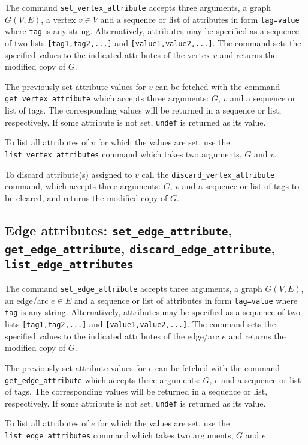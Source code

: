 \documentclass[a4paper,11pt]{article}
\begin{document}
The command {\tt set\_vertex\_attribute} accepts three arguments, a graph $ G(V,E) $, a vertex $ v\in V $ and a sequence or list of attributes in form {\tt tag=value} where {\tt tag} is any string. Alternatively, attributes may be specified as a sequence of two lists {\tt [tag1,tag2,...]} and {\tt [value1,value2,...]}. The command sets the specified values to the indicated attributes of the vertex $ v $ and returns the modified copy of $ G $.

The previously set attribute values for $ v $ can be fetched with the command {\tt get\_vertex\_attribute} which accepts three arguments: $ G $, $ v $ and a sequence or list of tags. The corresponding values will be returned in a sequence or list, respectively. If some attribute is not set, {\tt undef} is returned as its value.

To list all attributes of $ v $ for which the values are set, use the {\tt list\_vertex\_attributes} command which takes two arguments, $ G $ and $ v $.

To discard attribute(s) assigned to $ v $ call the {\tt discard\_vertex\_attribute} command, which accepts three arguments: $ G $, $ v $ and a sequence or list of tags to be cleared, and returns the modified copy of $ G $.

\subsection{Edge attributes: {\tt set\_edge\_attribute}, {\tt get\_edge\_attribute}, {\tt discard\_edge\_attribute}, {\tt list\_edge\_attributes}}

The command {\tt set\_edge\_attribute} accepts three arguments, a graph $ G(V,E) $, an edge/arc $ e\in E $ and a sequence or list of attributes in form {\tt tag=value} where {\tt tag} is any string. Alternatively, attributes may be specified as a sequence of two lists {\tt [tag1,tag2,...]} and {\tt [value1,value2,...]}. The command sets the specified values to the indicated attributes of the edge/arc $ e $ and returns the modified copy of $ G $.

The previously set attribute values for $ e $ can be fetched with the command {\tt get\_edge\_attribute} which accepts three arguments: $ G $, $ e $ and a sequence or list of tags. The corresponding values will be returned in a sequence or list, respectively. If some attribute is not set, {\tt undef} is returned as its value.

To list all attributes of $ e $ for which the values are set, use the {\tt list\_edge\_attributes} command which takes two arguments, $ G $ and $ e $.
\end{document}
